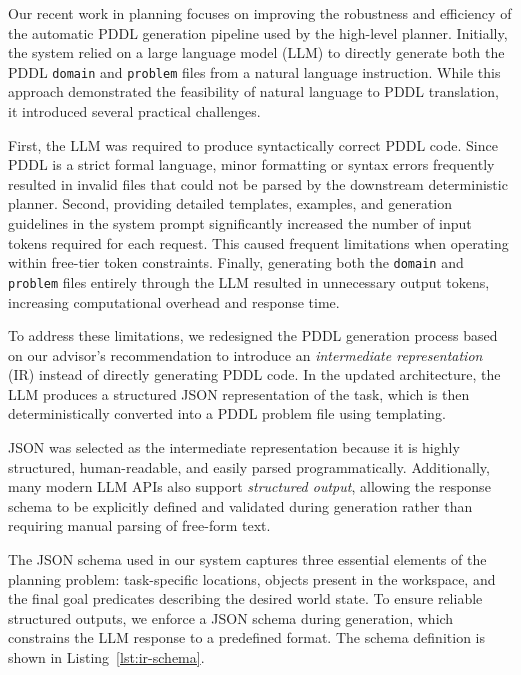 \documentclass[12pt]{extarticle}
\begin{document}
Our recent work in planning focuses on improving the robustness and efficiency of the automatic PDDL generation pipeline used by the high-level planner. Initially, the system relied on a large language model (LLM) to directly generate both the PDDL \texttt{domain} and \texttt{problem} files from a natural language instruction. While this approach demonstrated the feasibility of natural language to PDDL translation, it introduced several practical challenges.

First, the LLM was required to produce syntactically correct PDDL code. Since PDDL is a strict formal language, minor formatting or syntax errors frequently resulted in invalid files that could not be parsed by the downstream deterministic planner. Second, providing detailed templates, examples, and generation guidelines in the system prompt significantly increased the number of input tokens required for each request. This caused frequent limitations when operating within free-tier token constraints. Finally, generating both the \texttt{domain} and \texttt{problem} files entirely through the LLM resulted in unnecessary output tokens, increasing computational overhead and response time.

To address these limitations, we redesigned the PDDL generation process based on our advisor's recommendation to introduce an \textit{intermediate representation} (IR) instead of directly generating PDDL code. In the updated architecture, the LLM produces a structured JSON representation of the task, which is then deterministically converted into a PDDL problem file using templating.

JSON was selected as the intermediate representation because it is highly structured, human-readable, and easily parsed programmatically. Additionally, many modern LLM APIs also support \textit{structured output}, allowing the response schema to be explicitly defined and validated during generation rather than requiring manual parsing of free-form text.

The JSON schema used in our system captures three essential elements of the planning problem: task-specific locations, objects present in the workspace, and the final goal predicates describing the desired world state. To ensure reliable structured outputs, we enforce a JSON schema during generation, which constrains the LLM response to a predefined format. The schema definition is shown in Listing~\ref{lst:ir-schema}.
\end{document}
